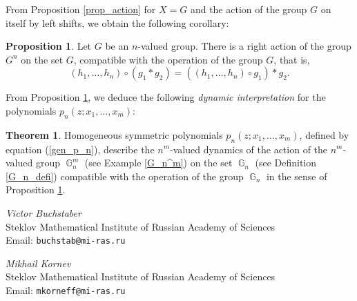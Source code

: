 \documentclass[14pt, dvipsnames]{extarticle}
\theoremstyle{definition}
\newtheorem{theorem}{Theorem}
\newtheorem{prop}{Proposition}
\theoremstyle{definition}
\theoremstyle{remark}
\DeclareMathOperator{\G}{\mathbb{G}}
\begin{document}
From Proposition \ref{prop_action} for $X = G$ and the action of the group $G$ on itself by left shifts, we obtain the following corollary:

\begin{prop}\label{G^n_action_on_G}
Let $G$ be an $n$-valued group. There is a right action of the group $G^n$ on the set $G$, compatible with the operation of the group $G$, that is,
$$ (h_1, \dots, h_n) \circ (g_1 \ast g_2) = ((h_1, \dots, h_n) \circ g_1) \ast g_2. $$
\end{prop}

From Proposition \ref{G^n_action_on_G}, we deduce the following {\it dynamic interpretation} for the polynomials $p_n(z; x_1, \dots, x_m)$:

\begin{theorem}\label{action}
Homogeneous symmetric polynomials $p_n(z; x_1, \dots, x_m)$, defined by equation (\ref{gen_p_n}), describe the $n^m$-valued dynamics of the action of the $n^m$-valued group $\G_n^m$ (see Example \ref{G_n^m}) on the set $\G_n$ (see Definition \ref{G_n_defi}) compatible with the operation of the group $\G_n$ in the sense of Proposition \ref{G^n_action_on_G}.
\end{theorem}









































\newpage









\vspace{2em}
\noindent
\textit{Victor Buchstaber}\\
Steklov Mathematical Institute of Russian Academy of Sciences\\
Email: \texttt{buchstab@mi-ras.ru}


\vspace{2em}
\noindent
\textit{Mikhail Kornev}\\
Steklov Mathematical Institute of Russian Academy of Sciences\\
Email: \texttt{mkorneff@mi-ras.ru}
\end{document}
